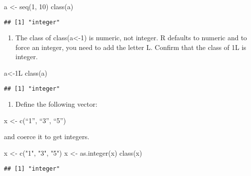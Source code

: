 \documentclass[
]{article}
\newenvironment{Shaded}{\begin{snugshade}}{\end{snugshade}}
\newcommand{\DecValTok}[1]{\textcolor[rgb]{0.00,0.00,0.81}{#1}}
\newcommand{\FunctionTok}[1]{\textcolor[rgb]{0.00,0.00,0.00}{#1}}
\newcommand{\NormalTok}[1]{#1}
\newcommand{\OtherTok}[1]{\textcolor[rgb]{0.56,0.35,0.01}{#1}}
\newcommand{\StringTok}[1]{\textcolor[rgb]{0.31,0.60,0.02}{#1}}
\providecommand{\tightlist}{%
  \setlength{\itemsep}{0pt}\setlength{\parskip}{0pt}}
\begin{document}
\begin{Shaded}
\begin{Highlighting}[]
\NormalTok{a }\OtherTok{\textless{}{-}} \FunctionTok{seq}\NormalTok{(}\DecValTok{1}\NormalTok{, }\DecValTok{10}\NormalTok{)}
\FunctionTok{class}\NormalTok{(a)}
\end{Highlighting}
\end{Shaded}

\begin{verbatim}
## [1] "integer"
\end{verbatim}

\begin{enumerate}
\def\labelenumi{\arabic{enumi}.}
\setcounter{enumi}{10}
\tightlist
\item
  The class of class(a\textless-1) is numeric, not integer. R defaults
  to numeric and to force an integer, you need to add the letter L.
  Confirm that the class of 1L is integer.
\end{enumerate}

\begin{Shaded}
\begin{Highlighting}[]
\NormalTok{a}\OtherTok{\textless{}{-}}\NormalTok{1L}
\FunctionTok{class}\NormalTok{(a)}
\end{Highlighting}
\end{Shaded}

\begin{verbatim}
## [1] "integer"
\end{verbatim}

\begin{enumerate}
\def\labelenumi{\arabic{enumi}.}
\setcounter{enumi}{11}
\tightlist
\item
  Define the following vector:
\end{enumerate}

x \textless- c(``1'', ``3'', ``5'')

and coerce it to get integers.

\begin{Shaded}
\begin{Highlighting}[]
\NormalTok{x }\OtherTok{\textless{}{-}} \FunctionTok{c}\NormalTok{(}\StringTok{"1"}\NormalTok{, }\StringTok{"3"}\NormalTok{, }\StringTok{"5"}\NormalTok{)}
\NormalTok{x }\OtherTok{\textless{}{-}} \FunctionTok{as.integer}\NormalTok{(x)}
\FunctionTok{class}\NormalTok{(x)}
\end{Highlighting}
\end{Shaded}

\begin{verbatim}
## [1] "integer"
\end{verbatim}
\end{document}
